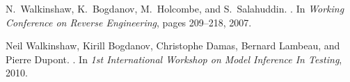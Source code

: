 \documentclass[]{sigplanconf}
\begin{document}
\begin{thebibliography}{10}
N.~Walkinshaw, K.~Bogdanov, M.~Holcombe, and S.~Salahuddin.
.
\newblock In {\em Working Conference on Reverse Engineering}, pages 209--218,
  2007.

Neil Walkinshaw, Kirill Bogdanov, Christophe Damas, Bernard Lambeau, and Pierre
  Dupont.
.
\newblock In {\em {1st International Workshop on Model Inference In Testing}},
  2010.

\end{thebibliography}
\end{document}
